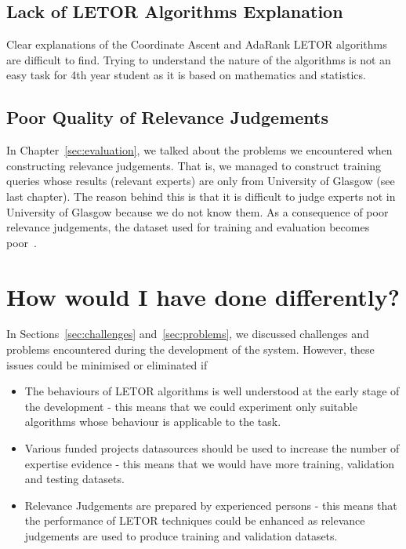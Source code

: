 \subsection{Lack of LETOR Algorithms Explanation}
Clear explanations of the Coordinate Ascent and AdaRank LETOR algorithms are difficult to find. Trying to understand the nature of 
the algorithms is not an easy task for 4th year student as it is based on mathematics and statistics.

\subsection{Poor Quality of Relevance Judgements}
In Chapter~\ref{sec:evaluation}, we talked about the problems we encountered when constructing relevance judgements. That is,
we managed to construct training queries whose results (relevant experts) are only from University of Glasgow (see last chapter). 
The reason behind this is that it is difficult to judge experts not in University of Glasgow because we do not know them.
As a consequence of poor relevance judgements, the dataset used for training and evaluation becomes poor~\cite{craig}.


\section{How would I have done differently?}
In Sections~\ref{sec:challenges} and~\ref{sec:problems}, we discussed challenges and problems encountered during the development of the system.
However, these issues could be minimised or eliminated if 
\begin{itemize}
 \item The behaviours of LETOR algorithms is well understood at the early stage of the development - this means that we could experiment only 
 suitable algorithms whose behaviour is applicable to the task.
 \item Various funded projects datasources should be used to increase the number of expertise evidence - this means that we would have more training, 
 validation and testing datasets.
 \item Relevance Judgements are prepared by experienced persons - this means that the performance of LETOR techniques could be enhanced as relevance judgements
 are used to produce training and validation datasets.
\end{itemize}



